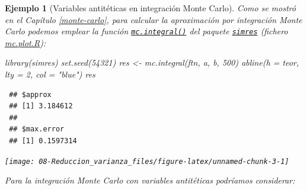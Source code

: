 \documentclass[
]{book}
\newenvironment{Shaded}{\begin{snugshade}}{\end{snugshade}}
\newcommand{\AttributeTok}[1]{\textcolor[rgb]{0.77,0.63,0.00}{#1}}
\newcommand{\DecValTok}[1]{\textcolor[rgb]{0.00,0.00,0.81}{#1}}
\newcommand{\FunctionTok}[1]{\textcolor[rgb]{0.00,0.00,0.00}{#1}}
\newcommand{\NormalTok}[1]{#1}
\newcommand{\OtherTok}[1]{\textcolor[rgb]{0.56,0.35,0.01}{#1}}
\newcommand{\StringTok}[1]{\textcolor[rgb]{0.31,0.60,0.02}{#1}}
\theoremstyle{break}
\newtheorem{example}{Ejemplo}[chapter]
\theoremstyle{nonumberplain}
\begin{document}
\begin{example}[Variables antitéticas en integración Monte Carlo]
Como se mostró en el Capítulo \ref{monte-carlo}, para calcular la aproximación por integración Monte Carlo podemos emplear la función \href{https://rubenfcasal.github.io/simres/reference/mc.integral.html}{\texttt{mc.integral()}} del paquete \href{https://rubenfcasal.github.io/simres}{\texttt{simres}} (fichero \href{R/mc.plot.R}{\emph{mc.plot.R}}):

\begin{Shaded}
\begin{Highlighting}[]
\FunctionTok{library}\NormalTok{(simres)}
\FunctionTok{set.seed}\NormalTok{(}\DecValTok{54321}\NormalTok{)}
\NormalTok{res }\OtherTok{\textless{}{-}} \FunctionTok{mc.integral}\NormalTok{(ftn, a, b, }\DecValTok{500}\NormalTok{)}
\FunctionTok{abline}\NormalTok{(}\AttributeTok{h =}\NormalTok{ teor, }\AttributeTok{lty =} \DecValTok{2}\NormalTok{, }\AttributeTok{col =} \StringTok{"blue"}\NormalTok{)}
\NormalTok{res}
\end{Highlighting}
\end{Shaded}

\begin{verbatim}
 ## $approx
 ## [1] 3.184612
 ## 
 ## $max.error
 ## [1] 0.1597314
\end{verbatim}

\begin{center}\texttt{[image: 08-Reduccion\_varianza\_files/figure-latex/unnamed-chunk-3-1]} \end{center}

Para la integración Monte Carlo con variables antitéticas podríamos considerar:


\end{example}
\end{document}
